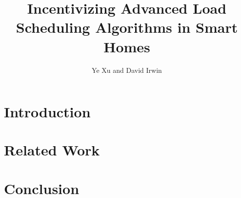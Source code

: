 \documentclass[10pt,nocopyrightspace]{sensys-proc}
\title{Incentivizing Advanced Load Scheduling Algorithms in Smart Homes}
\author{
\alignauthor Ye Xu and David Irwin
\affaddr{University of Massachusetts Amherst}
}
\begin{document}
 
\maketitle

\begin{abstract}

\end{abstract}

\section{Introduction}
\label{sec:introduction}


\section{Related Work}
\label{sec:related}


\section{Conclusion}
\label{sec:conclusion}




\end{document}
